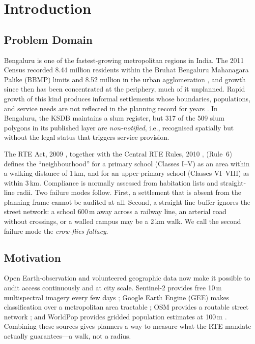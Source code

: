 \documentclass[conference]{IEEEtran}
\newcommand{\km}{\,km}
\newcommand{\m}{\,m}
\begin{document}
\section{Introduction}
\subsection{Problem Domain}
Bengaluru is one of the fastest-growing metropolitan regions in India. The 2011 Census recorded 8.44 million residents within the Bruhat Bengaluru Mahanagara Palike (BBMP) limits and 8.52 million in the urban agglomeration \cite{census2011}, and growth since then has been concentrated at the periphery, much of it unplanned. Rapid growth of this kind produces informal settlements whose boundaries, populations, and service needs are not reflected in the planning record for years \cite{unhabitat2003}. In Bengaluru, the KSDB maintains a slum register, but 317 of the 509 slum polygons in its published layer are \emph{non-notified}, i.e., recognised spatially but without the legal status that triggers service provision.

The RTE Act, 2009 \cite{rte2009}, together with the Central RTE Rules, 2010 \cite{rterules2010}, (Rule~6) defines the ``neighbourhood'' for a primary school (Classes I--V) as an area within a walking distance of 1\km{}, and for an upper-primary school (Classes VI--VIII) as within 3\km{}. Compliance is normally assessed from habitation lists and straight-line radii. Two failure modes follow. First, a settlement that is absent from the planning frame cannot be audited at all. Second, a straight-line buffer ignores the street network: a school 600\m{} away across a railway line, an arterial road without crossings, or a walled campus may be a 2\km{} walk. We call the second failure mode the \emph{crow-flies fallacy}.

\subsection{Motivation}
Open Earth-observation and volunteered geographic data now make it possible to audit access continuously and at city scale. Sentinel-2 provides free 10\m{} multispectral imagery every few days \cite{drusch2012}; Google Earth Engine (GEE) makes classification over a metropolitan area tractable \cite{gorelick2017}; OSM provides a routable street network \cite{boeing2017}; and WorldPop provides gridded population estimates at 100\m{} \cite{tatem2017}. Combining these sources gives planners a way to measure what the RTE mandate actually guarantees---a walk, not a radius.
\end{document}
